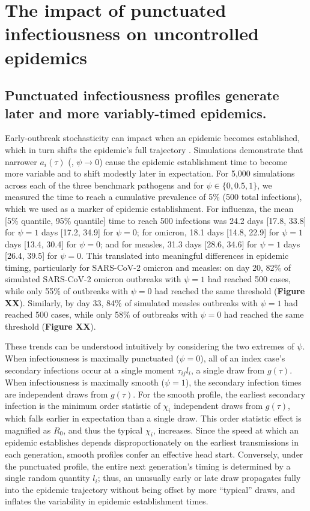 \section{The impact of punctuated infectiousness on uncontrolled epidemics}

\subsection{Punctuated infectiousness profiles generate later and more variably-timed epidemics.}

Early-outbreak stochasticity can impact when an epidemic becomes established, which in turn shifts the epidemic's full trajectory \citep{morris_computation_2024}. Simulations demonstrate that narrower $a_i(\tau)$ (\ie, $\psi \rightarrow 0$) cause the epidemic establishment time to become more variable and to shift modestly later in expectation. For 5,000 simulations across each of the three benchmark pathogens and for $\psi \in \{0, 0.5, 1\}$, we measured the time to reach a cumulative prevalence of 5\% (500 total infections), which we used as a marker of epidemic establishment. For influenza, the mean [5\% quantile, 95\% quantile] time to reach 500 infections was 24.2 days [17.8, 33.8] for $\psi = 1$  days [17.2, 34.9] for $\psi = 0$; for omicron, 18.1 days [14.8, 22.9] for $\psi = 1$  days [13.4, 30.4] for $\psi = 0$; and for measles, 31.3 days [28.6, 34.6] for $\psi = 1$  days [26.4, 39.5] for $\psi = 0$. This translated into meaningful differences in epidemic timing, particularly for SARS-CoV-2 omicron and measles: on day 20, 82\% of simulated SARS-CoV-2 omicron outbreaks with $\psi = 1$ had reached 500 cases, while only 55\% of outbreaks with $\psi = 0$ had reached the same threshold ({\bf Figure XX}).  Similarly, by day 33, 84\% of simulated measles outbreaks with $\psi = 1$ had reached 500 cases, while only 58\% of outbreaks with $\psi = 0$ had reached the same threshold ({\bf Figure XX}). 

These trends can be understood intuitively by considering the two extremes of $\psi$. When infectiousness is maximally punctuated ($\psi = 0$), all of an index case's secondary infections occur at a single moment $\tau_{ij}  l_i$, a single draw from $g(\tau)$. When infectiousness is maximally smooth ($\psi = 1$), the secondary infection times are independent draws from $g(\tau)$. For the smooth profile, the earliest secondary infection is the minimum order statistic of $\chi_i$ independent draws from $g(\tau)$, which falls earlier in expectation than a single draw. This order statistic effect is magnified as $R_0$, and thus the typical $\chi_i$, increases. Since the speed at which an epidemic establishes depends disproportionately on the earliest transmissions in each generation, smooth profiles confer an effective head start. Conversely, under the punctuated profile, the entire next generation's timing is determined by a single random quantity $l_i$; thus, an unusually early or late draw propagates fully into the epidemic trajectory without being offset by more ``typical'' draws, and inflates the variability in epidemic establishment times. 

